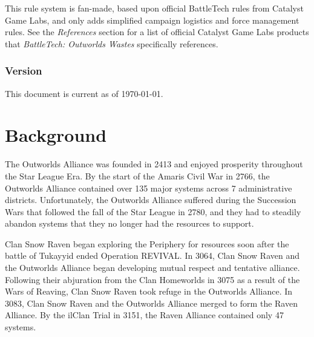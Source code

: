 \documentclass{article}
\begin{document}
This rule system is fan-made, based upon official BattleTech rules from Catalyst Game Labs, and only adds simplified campaign logistics and force management rules.
See the \emph{References} section for a list of official Catalyst Game Labs products that \emph{BattleTech: Outworlds Wastes} specifically references.

\subsubsection*{Version}

This document is current as of \today.

\newpage

\tableofcontents

\newpage

\section{Background}

The Outworlds Alliance was founded in 2413 and enjoyed prosperity throughout the Star League Era.
By the start of the Amaris Civil War in 2766, the Outworlds Alliance contained over 135 major systems across 7 administrative districts.
Unfortunately, the Outworlds Alliance suffered during the Succession Wars that followed the fall of the Star League in 2780, and they had to steadily abandon systems that they no longer had the resources to support.

Clan Snow Raven began exploring the Periphery for resources soon after the battle of Tukayyid ended Operation REVIVAL.
In 3064, Clan Snow Raven and the Outworlds Alliance began developing mutual respect and tentative alliance.
Following their abjuration from the Clan Homeworlds in 3075 as a result of the Wars of Reaving, Clan Snow Raven took refuge in the Outworlds Alliance.
In 3083, Clan Snow Raven and the Outworlds Alliance merged to form the Raven Alliance.
By the ilClan Trial in 3151, the Raven Alliance contained only 47 systems.
\end{document}
